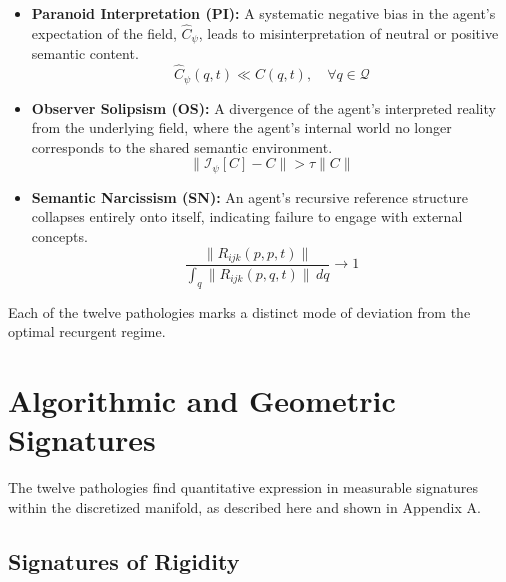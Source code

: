 \begin{itemize}
    \item \textbf{Paranoid Interpretation (PI):} A systematic negative bias in the agent's expectation of the field, \(\hat{C}_{\psi}\), leads to misinterpretation of neutral or positive semantic content.
    \begin{equation}
    \hat{C}_{\psi}(q,t) \ll C(q,t), \quad \forall q \in \mathcal{Q}
    \end{equation}

    \item \textbf{Observer Solipsism (OS):} A divergence of the agent's interpreted reality from the underlying field, where the agent's internal world no longer corresponds to the shared semantic environment.
    \begin{equation}
    \|\mathcal{I}_{\psi}[C] - C\| > \tau \|C\|
    \end{equation}

    \item \textbf{Semantic Narcissism (SN):} An agent's recursive reference structure collapses entirely onto itself, indicating failure to engage with external concepts.
    \begin{equation}
    \frac{\|R_{ijk}(p,p,t)\|}{\int_q \|R_{ijk}(p,q,t)\| \, dq} \to 1
    \end{equation}
\end{itemize}

Each of the twelve pathologies marks a distinct mode of deviation from the optimal recurgent regime.


\section{Algorithmic and Geometric Signatures}
\label{sec:algorithmic_and_geometric_signatures}

The twelve pathologies find quantitative expression in measurable signatures within the discretized manifold, as described here and shown in Appendix A.


\subsection{Signatures of Rigidity}
\label{sec:signatures_of_rigidity}

